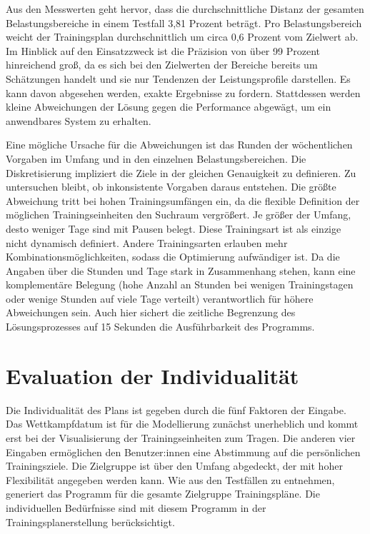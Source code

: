 Aus den Messwerten geht hervor, dass die durchschnittliche Distanz der gesamten Belastungsbereiche in einem Testfall 3,81 Prozent beträgt. Pro Belastungsbereich weicht der Trainingsplan durchschnittlich um circa 0,6 Prozent vom Zielwert ab. Im Hinblick auf den Einsatzzweck ist die Präzision von über 99 Prozent hinreichend groß, da es sich bei den Zielwerten der Bereiche bereits um Schätzungen handelt und sie nur Tendenzen der Leistungsprofile darstellen. Es kann davon abgesehen werden, exakte Ergebnisse zu fordern. Stattdessen werden kleine Abweichungen der Lösung gegen die Performance abgewägt, um ein anwendbares System zu erhalten.

Eine mögliche Ursache für die Abweichungen ist das Runden der wöchentlichen Vorgaben im Umfang und in den einzelnen Belastungsbereichen. Die Diskretisierung impliziert die Ziele in der gleichen Genauigkeit zu definieren. Zu untersuchen bleibt, ob inkonsistente Vorgaben daraus entstehen. \newline
Die größte Abweichung tritt bei hohen Trainingsumfängen ein, da die flexible Definition der möglichen Trainingseinheiten den Suchraum vergrößert. Je größer der Umfang, desto weniger Tage sind mit Pausen belegt. Diese Trainingsart ist als einzige nicht dynamisch definiert. Andere Trainingsarten erlauben mehr Kombinationsmöglichkeiten, sodass die Optimierung aufwändiger ist.\newline
Da die Angaben über die Stunden und Tage stark in Zusammenhang stehen, kann eine komplementäre Belegung (hohe Anzahl an Stunden bei wenigen Trainingstagen oder wenige Stunden auf viele Tage verteilt) verantwortlich für höhere Abweichungen sein. Auch hier sichert die zeitliche Begrenzung des Lösungsprozesses auf 15 Sekunden die Ausführbarkeit des Programms. 

\section{Evaluation der Individualität}
Die Individualität des Plans ist gegeben durch die fünf Faktoren der Eingabe. Das Wettkampfdatum ist für die Modellierung zunächst unerheblich und kommt erst bei der Visualisierung der Trainingseinheiten zum Tragen. Die anderen vier Eingaben ermöglichen den Benutzer:innen eine Abstimmung auf die persönlichen Trainingsziele. Die Zielgruppe ist über den Umfang abgedeckt, der mit hoher Flexibilität angegeben werden kann. Wie aus den Testfällen zu entnehmen, generiert das Programm für die gesamte Zielgruppe Trainingspläne. Die individuellen Bedürfnisse sind mit diesem Programm in der Trainingsplanerstellung berücksichtigt.
